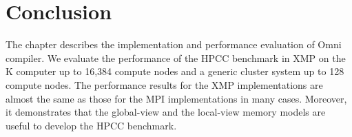 \documentclass[graybox]{svmult}
\begin{document}



\section{Conclusion}\label{sec:summary}
The chapter describes the  implementation and performance evaluation of Omni compiler.
We evaluate the performance of the HPCC benchmark in XMP on the K computer up to 16,384 compute nodes and a generic cluster system up to 128 compute nodes.
The performance results for the XMP implementations are almost the same as those for the MPI implementations in many cases.
Moreover, it demonstrates that the global-view and the local-view  memory models are useful to develop the HPCC benchmark.



\end{document}

